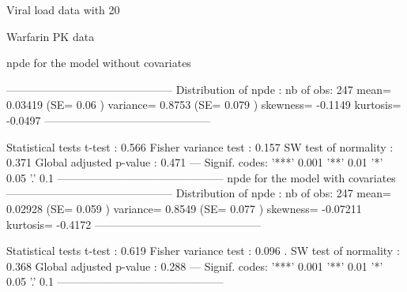 \documentclass{article}
\begin{document}
\begin{Schunk}
\begin{Soutput}
Viral load data with 20%
\end{Soutput}
\begin{Soutput}
[1] "computenpde.loq<-function(npdeObject) {"
---------------------------------------------
Distribution of npde :
      nb of obs: 300 
           mean= -0.03127   (SE= 0.053 )
       variance= 0.8358   (SE= 0.068 )
       skewness= 0.04592 
       kurtosis= -0.3856 
---------------------------------------------

Statistical tests
  t-test                     : 0.554
  Fisher variance test       : 0.0355 *
  SW test of normality       : 0.499
Global adjusted p-value      : 0.107
---
Signif. codes: '***' 0.001 '**' 0.01 '*' 0.05 '.' 0.1 
---------------------------------------------
\end{Soutput}
\begin{Soutput}
Warfarin PK data
\end{Soutput}
\begin{Soutput}
      npde for the model without covariates
\end{Soutput}
\begin{Soutput}
---------------------------------------------
Distribution of npde :
      nb of obs: 247 
           mean= 0.03419   (SE= 0.06 )
       variance= 0.8753   (SE= 0.079 )
       skewness= -0.1149 
       kurtosis= -0.0497 
---------------------------------------------

Statistical tests
  t-test                     : 0.566
  Fisher variance test       : 0.157
  SW test of normality       : 0.371
Global adjusted p-value      : 0.471
---
Signif. codes: '***' 0.001 '**' 0.01 '*' 0.05 '.' 0.1 
---------------------------------------------
      npde for the model with covariates
---------------------------------------------
Distribution of npde :
      nb of obs: 247 
           mean= 0.02928   (SE= 0.059 )
       variance= 0.8549   (SE= 0.077 )
       skewness= -0.07211 
       kurtosis= -0.4172 
---------------------------------------------

Statistical tests
  t-test                     : 0.619
  Fisher variance test       : 0.096 .
  SW test of normality       : 0.368
Global adjusted p-value      : 0.288
---
Signif. codes: '***' 0.001 '**' 0.01 '*' 0.05 '.' 0.1 
---------------------------------------------
\end{Soutput}
\end{Schunk}
\end{document}
